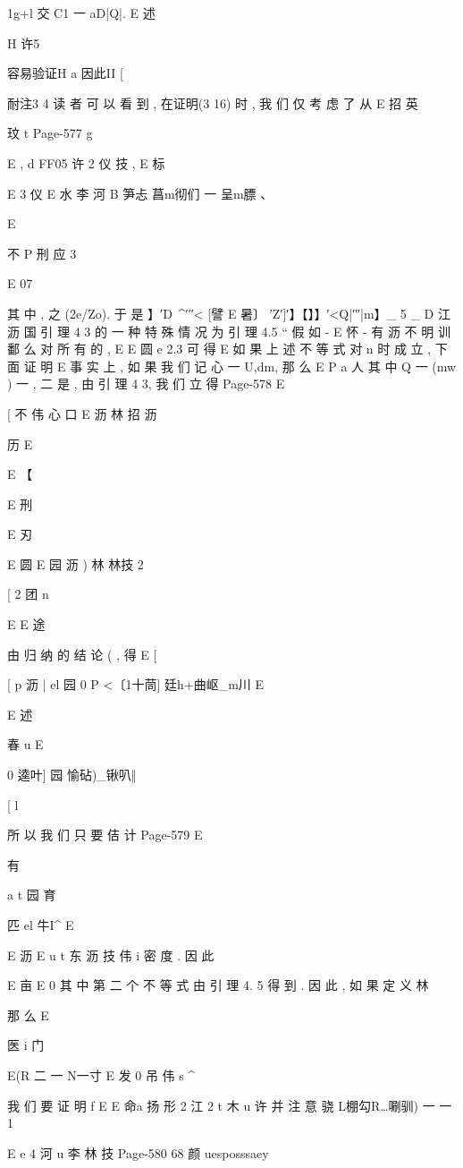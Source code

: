 {1g+l 交 C1 一 aD|Q|.
E 述

H 许5

容易验证H a 因此II [

耐注3 4 读 者 可 以 看 到 , 在证明(3 16) 时 , 我 们 仅 考 虑 了 从
E 招
英

玟
t
Page-577
g

E , d
FF05 许 2 仪 技 ,
E 标

E 3 仪 E 水 李 河
B 笋忐 菖m彻们 一 呈m膘 、

E

不
P 刑 应 3

E 07

其 中 , 之 (2e/Zo). 于 是
】′D~^′′′< [譬 E 暑〕 ′Z′]′】【】】′<Q|′″|m】_ 5 _
D 江 沥 国
引 理 4 3 的 一 种 特 殊 情 况 为
引 理 4.5 “ 假 如 -
E 怀 - 有 沥 不 明 训
鄱 么 对 所 有 的 ,
E
E 圆 e
2.3 可 得
E
如 果 上 述 不 等 式 对 n 时 成 立 , 下 面 证 明
E
事 实 上 , 如 果 我 们 记 心 一 U,dm, 那 么
E P
a
人
其 中 Q 一 (mw ) 一 , 二 是 , 由 引 理 4 3, 我 们 立 得
Page-578
E

[
不 伟 心 口
E 沥 林 招 沥

历
E

E 【

E 刑

E 刃

E 圆
E 园 沥 ) 林 林技 2

[ 2
团 n

E E 途

由 归 纳 的 结 论 ( , 得
E
[

[
p 沥
| el 园 0
P <〔1十茼] 廷h+曲岖_m川 E

E 述

春
u
E

0 逵叶] 园 愉砧)_锹叭‖

[ l

所 以 我 们 只 要 佶 计
Page-579
E

有

a
t 园 育

匹 el 牛I^ E

E 沥
E u t 东 沥 技 伟 i
密 度 . 因 此

E 亩 E 0
其 中 第 二 个 不 等 式 由 引 理 4. 5 得 到 . 因 此 , 如 果 定 义
林

那 么
E

医 i 门

E(R 二 一 N一寸 E 发 0 吊 伟
s ^

我 们 要 证 明
f E
E 命a 扬 形 2 江 2
t 木 u 许
并 注 意 骁
L棚勾R…唰驯) 一 一 1

E e 4 河
u 李 林 技
Page-580
68 颜 uesposssaey

}

